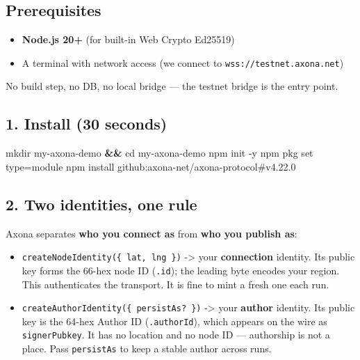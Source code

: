 \documentclass[
  nobib]{tufte-handout}
\newenvironment{Shaded}{}{}
\newcommand{\AttributeTok}[1]{\textcolor[rgb]{0.49,0.56,0.16}{#1}}
\newcommand{\BuiltInTok}[1]{\textcolor[rgb]{0.00,0.50,0.00}{#1}}
\newcommand{\ExtensionTok}[1]{#1}
\newcommand{\FunctionTok}[1]{\textcolor[rgb]{0.02,0.16,0.49}{#1}}
\newcommand{\KeywordTok}[1]{\textcolor[rgb]{0.00,0.44,0.13}{\textbf{#1}}}
\newcommand{\NormalTok}[1]{#1}
\providecommand{\tightlist}{%
  \setlength{\itemsep}{0pt}\setlength{\parskip}{0pt}}
\begin{document}
\subsection{Prerequisites}\label{prerequisites}

\begin{itemize}
\tightlist
\item
  \textbf{Node.js 20+} (for built-in Web Crypto Ed25519)
\item
  A terminal with network access (we connect to
  \texttt{wss://testnet.axona.net})
\end{itemize}

No build step, no DB, no local bridge --- the testnet bridge is the
entry point.

\subsection{1. Install (30 seconds)}\label{install-30-seconds}

\begin{Shaded}
\begin{Highlighting}[]
\FunctionTok{mkdir}\NormalTok{ my{-}axona{-}demo }\KeywordTok{\&\&} \BuiltInTok{cd}\NormalTok{ my{-}axona{-}demo}
\ExtensionTok{npm}\NormalTok{ init }\AttributeTok{{-}y}
\ExtensionTok{npm}\NormalTok{ pkg set type=module}
\ExtensionTok{npm}\NormalTok{ install github:axona{-}net/axona{-}protocol\#v4.22.0}
\end{Highlighting}
\end{Shaded}

\subsection{2. Two identities, one rule}\label{two-identities-one-rule}

Axona separates \textbf{who you connect as} from \textbf{who you publish
as}:

\begin{itemize}
\tightlist
\item
  \texttt{createNodeIdentity(\{\ lat,\ lng\ \})} -\textgreater{} your
  \textbf{connection} identity. Its public key forms the 66-hex node ID
  (\texttt{.id}); the leading byte encodes your region. This
  authenticates the transport. It is fine to mint a fresh one each run.
\item
  \texttt{createAuthorIdentity(\{\ persistAs?\ \})} -\textgreater{} your
  \textbf{author} identity. Its public key is the 64-hex Author ID
  (\texttt{.authorId}), which appears on the wire as
  \texttt{signerPubkey}. It has no location and no node ID ---
  authorship is not a place. Pass \texttt{persistAs} to keep a stable
  author across runs.
\end{itemize}
\end{document}
